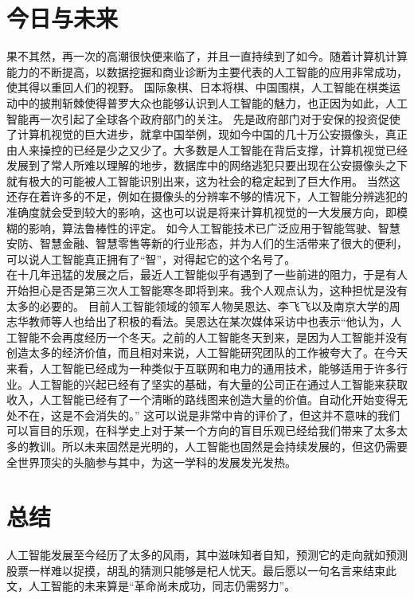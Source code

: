 \documentclass[12pt]{ctexart}
\begin{document}
\section{今日与未来}
\indent 果不其然，再一次的高潮很快便来临了，并且一直持续到了如今。随着计算机计算能力的不断提高，以数据挖掘和商业诊断为主要代表的人工智能的应用非常成功，使其得以重回人们的视野。
国际象棋、日本将棋、中国围棋，人工智能在棋类运动中的披荆斩棘使得普罗大众也能够认识到人工智能的魅力，也正因为如此，人工智能再一次引起了全球各个政府部门的关注。
先是政府部门对于安保的投资促使了计算机视觉的巨大进步，就拿中国举例，现如今中国的几十万公安摄像头，真正由人来操控的已经是少之又少了。大多数是人工智能在背后支撑，计算机视觉已经发展到了常人所难以理解的地步，数据库中的网络逃犯只要出现在公安摄像头之下就有极大的可能被人工智能识别出来，这为社会的稳定起到了巨大作用。
当然这还存在着许多的不足，例如在摄像头的分辨率不够的情况下，人工智能分辨逃犯的准确度就会受到较大的影响，这也可以说是将来计算机视觉的一大发展方向，即模糊的影响，算法鲁棒性的评定。
如今人工智能技术已广泛应用于智能驾驶、智慧安防、智慧金融、智慧零售等新的行业形态，并为人们的生活带来了很大的便利，可以说人工智能真正拥有了``智''，对得起它的这个名号了。\\
\indent 在十几年迅猛的发展之后，最近人工智能似乎有遇到了一些前进的阻力，于是有人开始担心是否是第三次人工智能寒冬即将到来。我个人观点认为，这种担忧是没有太多的必要的。
目前人工智能领域的领军人物吴恩达、李飞飞以及南京大学的周志华教师等人也给出了积极的看法。吴恩达在某次媒体采访中也表示``他认为，人工智能不会再度经历一个冬天。之前的人工智能冬天到来，是因为人工智能并没有创造太多的经济价值，而且相对来说，人工智能研究团队的工作被夸大了。在今天来看，人工智能已经成为一种类似于互联网和电力的通用技术，能够适用于许多行业。人工智能的兴起已经有了坚实的基础，有大量的公司正在通过人工智能来获取收入，人工智能已经有了一个清晰的路线图来创造大量的价值。自动化开始变得无处不在，这是不会消失的。''
这可以说是非常中肯的评价了，但这并不意味的我们可以盲目的乐观，在科学史上对于某一个方向的盲目乐观已经给我们带来了太多太多的教训。所以未来固然是光明的，人工智能也固然是会持续发展的，但这仍需要全世界顶尖的头脑参与其中，为这一学科的发展发光发热。\\

\section{总结}
\indent 人工智能发展至今经历了太多的风雨，其中滋味知者自知，预测它的走向就如预测股票一样难以捉摸，胡乱的猜测只能够是杞人忧天。最后愿以一句名言来结束此文，人工智能的未来算是``革命尚未成功，同志仍需努力''。
\newpage



\end{document}
